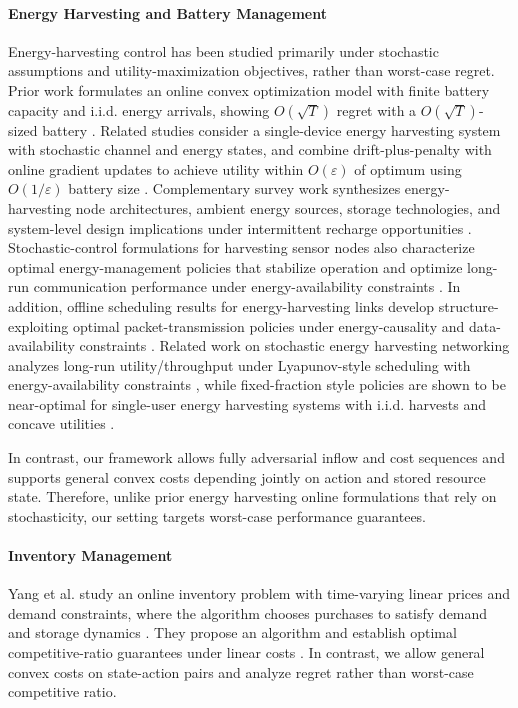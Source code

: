 \documentclass[11pt]{article}
\begin{document}
\paragraph{Energy Harvesting and Battery Management}
Energy-harvesting control has been studied primarily under stochastic assumptions and utility-maximization objectives, rather than worst-case regret. Prior work formulates an online convex optimization model with finite battery capacity and i.i.d. energy arrivals, showing $O(\sqrt{T})$ regret with a $O(\sqrt{T})$-sized battery \cite{Asgari2020}. Related studies consider a single-device energy harvesting system with stochastic channel and energy states, and combine drift-plus-penalty with online gradient updates to achieve utility within $O(\varepsilon)$ of optimum using $O(1/\varepsilon)$ battery size \cite{Yu2019}. Complementary survey work synthesizes energy-harvesting node architectures, ambient energy sources, storage technologies, and system-level design implications under intermittent recharge opportunities \cite{sudevalayam2011energy}. Stochastic-control formulations for harvesting sensor nodes also characterize optimal energy-management policies that stabilize operation and optimize long-run communication performance under energy-availability constraints \cite{sharma2010optimal}. In addition, offline scheduling results for energy-harvesting links develop structure-exploiting optimal packet-transmission policies under energy-causality and data-availability constraints \cite{yang2011optimal}. Related work on stochastic energy harvesting networking analyzes long-run utility/throughput under Lyapunov-style scheduling with energy-availability constraints \cite{Huang2013}, while fixed-fraction style policies are shown to be near-optimal for single-user energy harvesting systems with i.i.d. harvests and concave utilities \cite{arafa2017energy}.

In contrast, our framework allows fully adversarial inflow and cost sequences and supports general convex costs depending jointly on action and stored resource state. Therefore, unlike prior energy harvesting online formulations that rely on stochasticity, our setting targets worst-case performance guarantees.



\paragraph{Inventory Management}
Yang et al. study an online inventory problem with time-varying linear prices and demand constraints, where the algorithm chooses purchases to satisfy demand and storage dynamics \cite{yang2020online}. They propose an algorithm and establish optimal competitive-ratio guarantees under linear costs \cite{yang2020online}. In contrast, we allow general convex costs on state-action pairs and analyze regret rather than worst-case competitive ratio.
\end{document}
